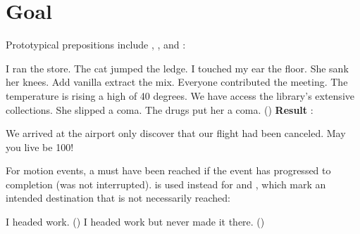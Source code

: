 \section{Goal}


Prototypical prepositions include , , and :
\begin{exe}
  \ex I ran  the store.
  \ex The cat jumped  the ledge.
  \ex I touched my ear  the floor.
  \ex She sank  her knees.
  \ex Add vanilla extract  the mix.
  \ex Everyone contributed  the meeting.
  \ex The temperature is rising  a high of 40 degrees.
  \ex We have access  the library's extensive collections.
  \ex She slipped  a coma.
  \ex The drugs put her  a coma. ()
  \ex \textbf{Result} \citep[p.~1224]{cgel}: \begin{xlist}
    \ex We arrived at the airport only  discover that our flight had been canceled.
    \ex May you live  be 100!
  \end{xlist}
\end{exe}
For motion events, a  must have been reached if the event 
has progressed to completion (was not interrupted).
 is used instead for  and , 
which mark an intended destination that is not necessarily reached:
\begin{exe}
  \ex\begin{xlist}
    \ex I headed  work. ()
    \ex I headed  work but never made it there. ()
  \end{xlist}
\end{exe}

